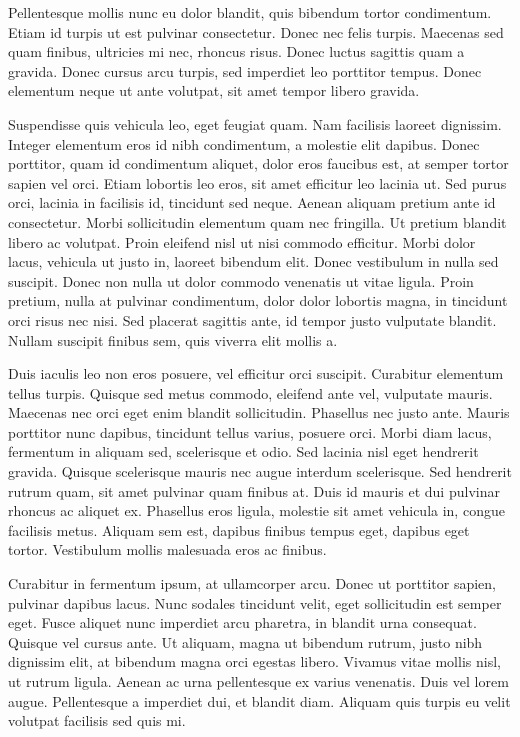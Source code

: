 \documentclass[12pt, twoside]{book}
\begin{document}
Pellentesque mollis nunc eu dolor blandit, quis bibendum tortor condimentum. Etiam id turpis ut est pulvinar consectetur. Donec nec felis turpis. Maecenas sed quam finibus, ultricies mi nec, rhoncus risus. Donec luctus sagittis quam a gravida. Donec cursus arcu turpis, sed imperdiet leo porttitor tempus. Donec elementum neque ut ante volutpat, sit amet tempor libero gravida.

Suspendisse quis vehicula leo, eget feugiat quam. Nam facilisis laoreet dignissim. Integer elementum eros id nibh condimentum, a molestie elit dapibus. Donec porttitor, quam id condimentum aliquet, dolor eros faucibus est, at semper tortor sapien vel orci. Etiam lobortis leo eros, sit amet efficitur leo lacinia ut. Sed purus orci, lacinia in facilisis id, tincidunt sed neque. Aenean aliquam pretium ante id consectetur. Morbi sollicitudin elementum quam nec fringilla. Ut pretium blandit libero ac volutpat. Proin eleifend nisl ut nisi commodo efficitur. Morbi dolor lacus, vehicula ut justo in, laoreet bibendum elit. Donec vestibulum in nulla sed suscipit. Donec non nulla ut dolor commodo venenatis ut vitae ligula. Proin pretium, nulla at pulvinar condimentum, dolor dolor lobortis magna, in tincidunt orci risus nec nisi. Sed placerat sagittis ante, id tempor justo vulputate blandit. Nullam suscipit finibus sem, quis viverra elit mollis a.

Duis iaculis leo non eros posuere, vel efficitur orci suscipit. Curabitur elementum tellus turpis. Quisque sed metus commodo, eleifend ante vel, vulputate mauris. Maecenas nec orci eget enim blandit sollicitudin. Phasellus nec justo ante. Mauris porttitor nunc dapibus, tincidunt tellus varius, posuere orci. Morbi diam lacus, fermentum in aliquam sed, scelerisque et odio. Sed lacinia nisl eget hendrerit gravida. Quisque scelerisque mauris nec augue interdum scelerisque. Sed hendrerit rutrum quam, sit amet pulvinar quam finibus at. Duis id mauris et dui pulvinar rhoncus ac aliquet ex. Phasellus eros ligula, molestie sit amet vehicula in, congue facilisis metus. Aliquam sem est, dapibus finibus tempus eget, dapibus eget tortor. Vestibulum mollis malesuada eros ac finibus.

Curabitur in fermentum ipsum, at ullamcorper arcu. Donec ut porttitor sapien, pulvinar dapibus lacus. Nunc sodales tincidunt velit, eget sollicitudin est semper eget. Fusce aliquet nunc imperdiet arcu pharetra, in blandit urna consequat. Quisque vel cursus ante. Ut aliquam, magna ut bibendum rutrum, justo nibh dignissim elit, at bibendum magna orci egestas libero. Vivamus vitae mollis nisl, ut rutrum ligula. Aenean ac urna pellentesque ex varius venenatis. Duis vel lorem augue. Pellentesque a imperdiet dui, et blandit diam. Aliquam quis turpis eu velit volutpat facilisis sed quis mi.
\end{document}
